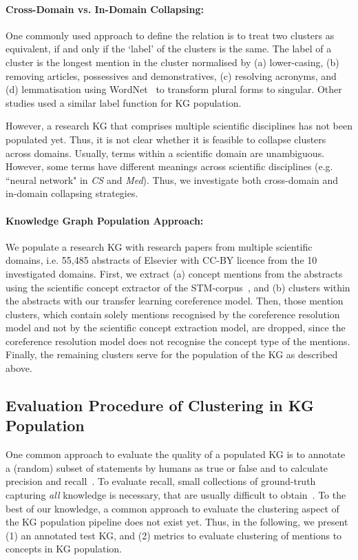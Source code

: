 \documentclass[runningheads]{llncs}
\begin{document}
\paragraph{Cross-Domain vs. In-Domain Collapsing:}
One commonly used approach to define the  relation is to treat two clusters as equivalent, if and only if the `label' of the clusters is the same.
The label of a cluster is the longest mention in the cluster normalised by (a) lower-casing, (b) removing articles, possessives and demonstratives, (c) resolving acronyms, and (d) lemmatisation using WordNet~\cite{Fellbaum2000WordNetA} to transform plural forms to singular. 
Other studies \cite{Dessi2020AIKG,Luan2018MultiTaskIO} used a similar label function for KG population.

However, a research KG that comprises multiple scientific disciplines has not been populated yet. 
Thus, it is not clear whether it is feasible to collapse clusters across domains. Usually, terms within a scientific domain are unambiguous. However, some terms have different meanings across scientific disciplines (e.g. ``neural network" in \emph{CS} and \emph{Med}).
Thus, we investigate both cross-domain and in-domain collapsing strategies.


\paragraph{Knowledge Graph Population Approach:}
We populate a research KG with research papers from multiple scientific domains, i.e. 55,485 abstracts of Elsevier with CC-BY licence from the 10 investigated domains.
First, we extract (a) concept mentions from the abstracts using the scientific concept extractor of the STM-corpus~\cite{Brack2020DomainindependentEO}, and (b) clusters within the abstracts with our transfer learning coreference model.
Then, those mention clusters, which contain solely mentions recognised by the coreference resolution model and not by the scientific concept extraction model, are dropped, since the coreference resolution model does not recognise the concept type of the mentions.
Finally, the remaining clusters serve for the population of the KG as described above.

\subsection{Evaluation Procedure of Clustering in KG Population}

One common approach to evaluate the quality of a populated KG is to annotate a (random) subset of statements by humans as true or false and to calculate precision and recall~\cite{Dessi2020AIKG,Weikum2020MachineKnowledge}. To evaluate recall, small collections of ground-truth capturing \emph{all} knowledge is necessary, that are usually difficult to obtain~\cite{Weikum2020MachineKnowledge}.
To the best of our knowledge, a common approach to evaluate the clustering aspect of the KG population pipeline does not exist yet.
Thus, in the following, we present (1) an annotated test KG, and (2) metrics to evaluate clustering of mentions to concepts in KG population.
\end{document}
